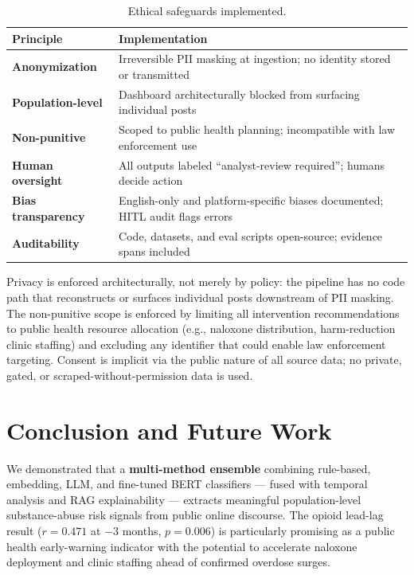 \documentclass[10pt,twocolumn]{article}
\begin{document}
\begin{table}[H]
\centering
\caption{Ethical safeguards implemented.}
\scriptsize
\begin{tabularx}{\columnwidth}{@{}>{\bfseries}lX@{}}
  \toprule
  Principle & Implementation \\
  \midrule
  Anonymization     & Irreversible PII masking at ingestion; no identity stored or transmitted \\
  Population-level  & Dashboard architecturally blocked from surfacing individual posts \\
  Non-punitive      & Scoped to public health planning; incompatible with law enforcement use \\
  Human oversight   & All outputs labeled ``analyst-review required''; humans decide action \\
  Bias transparency & English-only and platform-specific biases documented; HITL audit flags errors \\
  Auditability      & Code, datasets, and eval scripts open-source; evidence spans included \\
  \bottomrule
\end{tabularx}
\end{table}

Privacy is enforced architecturally, not merely by policy: the pipeline has no code path that reconstructs or surfaces individual posts downstream of PII masking. The non-punitive scope is enforced by limiting all intervention recommendations to public health resource allocation (e.g., naloxone distribution, harm-reduction clinic staffing) and excluding any identifier that could enable law enforcement targeting. Consent is implicit via the public nature of all source data; no private, gated, or scraped-without-permission data is used.

\section{Conclusion and Future Work}

We demonstrated that a \textbf{multi-method ensemble} combining rule-based, embedding, LLM, and fine-tuned BERT classifiers — fused with temporal analysis and RAG explainability — extracts meaningful population-level substance-abuse risk signals from public online discourse. The opioid lead-lag result ($r = 0.471$ at $-3$ months, $p = 0.006$) is particularly promising as a public health early-warning indicator with the potential to accelerate naloxone deployment and clinic staffing ahead of confirmed overdose surges.
\end{document}
